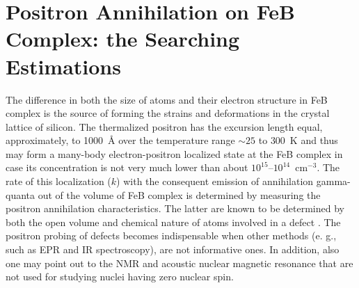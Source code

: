 \documentclass{ttp}
\begin{document}
\section{Positron Annihilation on FeB Complex: the Searching Estimations}

The difference in both the size of atoms and their electron structure in FeB complex 
is the source of forming the strains and deformations in the crystal lattice of silicon. 
The thermalized positron has the excursion length \cite{Krause1999} equal, 
approximately, to 1000~{\AA} over the temperature range $\sim25$ to $300$~K 
and thus may form a many-body electron-positron localized state at the 
FeB complex in case its concentration is not very much lower than about $10^{15} – 10^{14}$~cm$^{−3}$. 
The rate of this localization ($k$) with the consequent emission of annihilation 
gamma-quanta out of the volume of FeB complex is determined by measuring the positron annihilation characteristics. 
The latter are known to be determined by both the open volume and chemical nature of atoms involved in a defect \cite{Krause1999}. 
The positron probing of defects becomes indispensable when other methods 
(e. g., such as EPR and IR spectroscopy), are not informative ones.  
In addition, also one may point out to the NMR and acoustic nuclear magnetic resonance 
that are not used for studying nuclei having zero nuclear spin.
\end{document}
